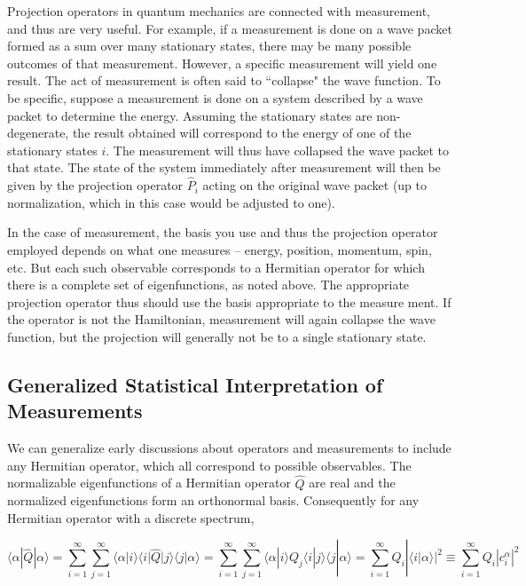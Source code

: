 Projection operators in quantum mechanics are connected with measurement, and thus are very
useful. For example, if a measurement is done on a wave packet formed as a sum
over many stationary states, there may be many possible outcomes of that
measurement. However, a specific
measurement will yield one result. The act of measurement is often said to
``collapse" the wave function. To be specific, suppose a measurement is done on
a system described by a wave packet to determine the energy. Assuming the
stationary states are non-degenerate, the result obtained will correspond to
the energy of one of the stationary states $i$. The measurement will thus have
collapsed the wave packet to that state. The state of the system immediately
after measurement will then be given by the projection operator $\hat{P}_i$
acting on the original wave packet (up to normalization, which in this case
would be adjusted to one).

In the case of measurement, the basis you use and thus the projection operator
employed depends on what one measures -- energy, position, momentum, spin,
etc. But each such observable
corresponds to a Hermitian operator for which there is a complete set of eigenfunctions, as noted
above. The appropriate projection operator thus should use the basis
appropriate to the measure ment. If the operator is not the Hamiltonian,
measurement will again collapse the wave function,
but the projection will generally not be to a single stationary state.


\subsection{Generalized Statistical Interpretation of Measurements} 


We can generalize early discussions about operators and measurements to include
any Hermitian operator, which all correspond to possible observables. The
normalizable eigenfunctions of a Hermitian operator $\hat{Q}$ are real and the
normalized eigenfunctions form an orthonormal basis. Consequently for any
Hermitian operator with a discrete spectrum, 

\[
\langle \alpha | \hat{Q} | \alpha \rangle = \sum_{i=1}^{\infty}
\sum_{j=1}^{\infty} \langle \alpha | i\rangle \langle i | \hat{Q} | j\rangle
\langle j | \alpha \rangle = \sum_{i=1}^{\infty} \sum_{j=1}^{\infty} \langle
\alpha | i \rangle Q_j \langle i | j \rangle \langle j | \alpha \rangle
= \sum_{i=1}^{\infty} Q_i | \langle i | \alpha \rangle|^2 \equiv
\sum_{i=1}^{\infty} Q_i |c_i^\alpha |^2  
\] \vspace{3px}

